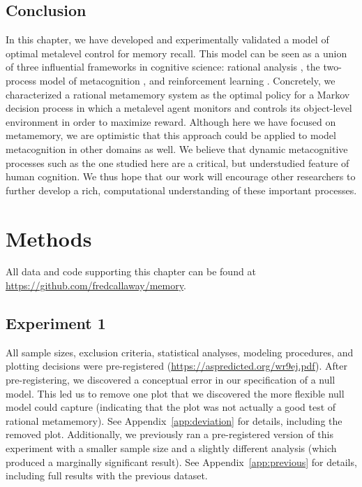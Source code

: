 \subsection{Conclusion}

In this chapter, we have developed and experimentally validated a model of optimal metalevel control for memory recall. This model can be seen as a union of three influential frameworks in cognitive science: rational analysis \citep{anderson1990adaptive}, the two-process model of metacognition \citepnelson{}, and reinforcement learning \citep{dayan2008decision}. Concretely, we characterized a rational metamemory system as the optimal policy for a Markov decision process in which a metalevel agent monitors and controls its object-level environment in order to maximize reward. Although here we have focused on metamemory, we are optimistic that this approach could be applied to model metacognition in other domains as well. We believe that dynamic metacognitive processes such as the one studied here are a critical, but understudied feature of human cognition. We thus hope that our work will encourage other researchers to further develop a rich, computational understanding of these important processes.

\section{Methods}

All data and code supporting this chapter can be found at \url{https://github.com/fredcallaway/memory}.

\subsection{Experiment 1}\label{sec:memory-methods1}

All sample sizes, exclusion criteria, statistical analyses, modeling procedures, and plotting decisions were pre-registered (\url{https://aspredicted.org/wr9ej.pdf}). After pre-registering, we discovered a conceptual error in our specification of a null model. This led us to remove one plot that we discovered the more flexible null model could capture (indicating that the plot was not actually a good test of rational metamemory). See Appendix~\ref{app:deviation} for details, including the removed plot. Additionally, we previously ran a pre-registered version of this experiment with a smaller sample size and a slightly different analysis (which produced a marginally significant result). See Appendix~\ref{app:previous} for details, including full results with the previous dataset.

